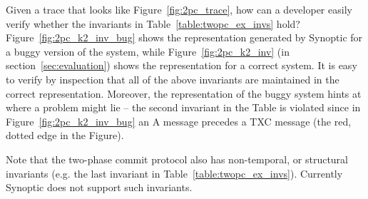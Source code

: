 Given a trace that looks like Figure~\ref{fig:2pc_trace}, how can a
developer easily verify whether the invariants in
Table~\ref{table:twopc_ex_invs} hold?  Figure~\ref{fig:2pc_k2_inv_bug}
shows the representation generated by Synoptic for a buggy version of
the system, while Figure~\ref{fig:2pc_k2_inv} (in
section~\ref{sec:evaluation}) shows the representation for a correct
system. It is easy to verify by inspection that all of the above
invariants are maintained in the correct representation. Moreover, the
representation of the buggy system hints at where a problem might lie
-- the second invariant in the Table is violated since in
Figure~\ref{fig:2pc_k2_inv_bug} an A message precedes a TXC message
(the red, dotted edge in the Figure).

Note that the two-phase commit protocol also has non-temporal, or
structural invariants (e.g. the last invariant in
Table~\ref{table:twopc_ex_invs}). Currently Synoptic does not support
such invariants.






